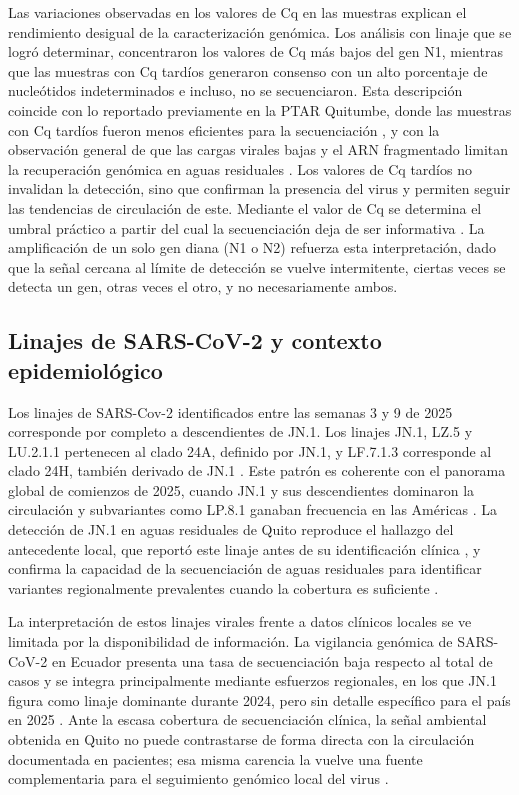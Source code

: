 Las variaciones observadas en los valores de Cq en las muestras explican el rendimiento desigual de la caracterización genómica. Los análisis con linaje que se logró determinar, concentraron los valores de Cq más bajos del gen N1, mientras que las muestras con Cq tardíos generaron consenso con un alto porcentaje de nucleótidos indeterminados e incluso, no se secuenciaron. Esta descripción coincide con lo reportado previamente en la PTAR Quitumbe, donde las muestras con Cq tardíos fueron menos eficientes para la secuenciación \cite{MejiaCalle_2024}, y con la observación general de que las cargas virales bajas y el ARN fragmentado limitan la recuperación genómica en aguas residuales \cite{Parkins_2023,Child_2023}. Los valores de Cq tardíos no invalidan la detección, sino que confirman la presencia del virus y permiten seguir las tendencias de circulación de este. Mediante el valor de Cq se determina el umbral práctico a partir del cual la secuenciación deja de ser informativa \cite{Ahmed_2020}. La amplificación de un solo gen diana (N1 o N2) refuerza esta interpretación, dado que la señal cercana al límite de detección se vuelve intermitente, ciertas veces se detecta un gen, otras veces el otro, y no necesariamente ambos.

\subsection{Linajes de SARS-CoV-2 y contexto epidemiológico}

Los linajes de SARS-Cov-2 identificados entre las semanas 3 y 9 de 2025 corresponde por completo a descendientes de JN.1. Los linajes JN.1, LZ.5 y LU.2.1.1 pertenecen al clado 24A, definido por JN.1, y LF.7.1.3 corresponde al clado 24H, también derivado de JN.1 \cite{Islam_2025}. Este patrón es coherente con el panorama global de comienzos de 2025, cuando JN.1 y sus descendientes dominaron la circulación y subvariantes como LP.8.1 ganaban frecuencia en las Américas \cite{Islam_2025}. La detección de JN.1 en aguas residuales de Quito reproduce el hallazgo del antecedente local, que reportó este linaje antes de su identificación clínica \cite{MejiaCalle_2024}, y confirma la capacidad de la secuenciación de aguas residuales para identificar variantes regionalmente prevalentes cuando la cobertura es suficiente \cite{Crits_Christoph_2021}.

La interpretación de estos linajes virales frente a datos clínicos locales se ve limitada por la disponibilidad de información. La vigilancia genómica de SARS-CoV-2 en Ecuador presenta una tasa de secuenciación baja respecto al total de casos y se integra principalmente mediante esfuerzos regionales, en los que JN.1 figura como linaje dominante durante 2024, pero sin detalle específico para el país en 2025 \cite{Bruno_2025}. Ante la escasa cobertura de secuenciación clínica, la señal ambiental obtenida en Quito no puede contrastarse de forma directa con la circulación documentada en pacientes; esa misma carencia la vuelve una fuente complementaria para el seguimiento genómico local del virus \cite{Bruno_2025,Parkins_2023}.

